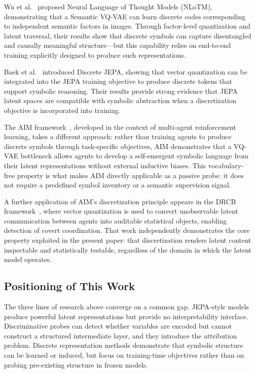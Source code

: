 \documentclass{article}
\begin{document}
Wu et al.~\cite{wu2024nlotm} proposed Neural Language of Thought
Models (NLoTM), demonstrating that a Semantic VQ-VAE can learn
discrete codes corresponding to independent semantic factors in
images.
Through factor-level quantization and latent traversal, their results
show that discrete symbols can capture disentangled and causally
meaningful structure---but this capability relies on end-to-end
training explicitly designed to produce such representations.

Baek et al.~\cite{baek2025discrete} introduced Discrete JEPA,
showing that vector quantization can be integrated into the JEPA
training objective to produce discrete tokens that support symbolic
reasoning.
Their results provide strong evidence that JEPA latent spaces are
compatible with symbolic abstraction when a discretization objective
is incorporated into training.

The AIM framework~\cite{liu2025aim}, developed in the context of
multi-agent reinforcement learning, takes a different approach:
rather than training agents to produce discrete symbols through
task-specific objectives, AIM demonstrates that a VQ-VAE bottleneck
allows agents to develop a self-emergent symbolic language from their
latent representations without external inductive biases.
This vocabulary-free property is what makes AIM directly applicable
as a passive probe: it does not require a predefined symbol inventory
or a semantic supervision signal.

A further application of AIM's discretization principle appears in
the DRCB framework~\cite{liu2026drcb}, where vector quantization is
used to convert unobservable latent communication between agents into
auditable statistical objects, enabling detection of covert
coordination.
That work independently demonstrates the core property exploited in
the present paper: that discretization renders latent content
inspectable and statistically testable, regardless of the domain in
which the latent model operates.

\subsection{Positioning of This Work}

The three lines of research above converge on a common gap.
JEPA-style models produce powerful latent representations but provide
no interpretability interface.
Discriminative probes can detect whether variables are encoded but
cannot construct a structured intermediate layer, and they introduce
the attribution problem.
Discrete representation methods demonstrate that symbolic structure
can be learned or induced, but focus on training-time objectives
rather than on probing pre-existing structure in frozen models.
\end{document}
